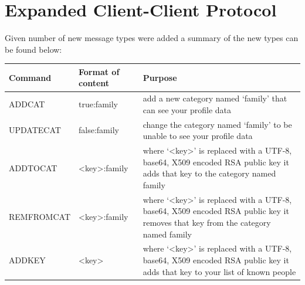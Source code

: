 \section{Expanded Client-Client Protocol}
Given number of new message types were added a summary of the new types
can be found below:

\begin{center}
\begin{tabular}{ | p{3cm} | p{3.5cm} | p{10cm} |}
    Command    & Format of content & Purpose \\ \hline
    ADDCAT     & true:family       & add a new category named `family' that can see your profile data\\
    UPDATECAT  & false:family      & change the category named `family' to be unable to see your profile data\\
    ADDTOCAT   & <key>:family      & where `<key>' is replaced with a UTF-8, base64, X509 encoded RSA public key it adds that key to the category named family\\
    REMFROMCAT & <key>:family      & where `<key>' is replaced with a UTF-8, base64, X509 encoded RSA public key it removes that key from the category named family\\
    ADDKEY     & <key>             & where `<key>' is replaced with a UTF-8, base64, X509 encoded RSA public key it adds that key to your list of known people\\
\end{tabular}
\end{center}
